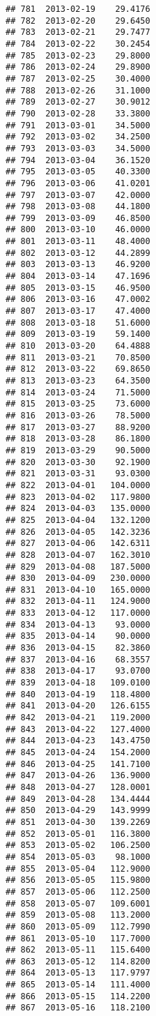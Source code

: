 \documentclass[
]{article}
\begin{document}
\begin{verbatim}
## 781  2013-02-19    29.4176
## 782  2013-02-20    29.6450
## 783  2013-02-21    29.7477
## 784  2013-02-22    30.2454
## 785  2013-02-23    29.8000
## 786  2013-02-24    29.8900
## 787  2013-02-25    30.4000
## 788  2013-02-26    31.1000
## 789  2013-02-27    30.9012
## 790  2013-02-28    33.3800
## 791  2013-03-01    34.5000
## 792  2013-03-02    34.2500
## 793  2013-03-03    34.5000
## 794  2013-03-04    36.1520
## 795  2013-03-05    40.3300
## 796  2013-03-06    41.0201
## 797  2013-03-07    42.0000
## 798  2013-03-08    44.1800
## 799  2013-03-09    46.8500
## 800  2013-03-10    46.0000
## 801  2013-03-11    48.4000
## 802  2013-03-12    44.2899
## 803  2013-03-13    46.9200
## 804  2013-03-14    47.1696
## 805  2013-03-15    46.9500
## 806  2013-03-16    47.0002
## 807  2013-03-17    47.4000
## 808  2013-03-18    51.6000
## 809  2013-03-19    59.1400
## 810  2013-03-20    64.4888
## 811  2013-03-21    70.8500
## 812  2013-03-22    69.8650
## 813  2013-03-23    64.3500
## 814  2013-03-24    71.5000
## 815  2013-03-25    73.6000
## 816  2013-03-26    78.5000
## 817  2013-03-27    88.9200
## 818  2013-03-28    86.1800
## 819  2013-03-29    90.5000
## 820  2013-03-30    92.1900
## 821  2013-03-31    93.0300
## 822  2013-04-01   104.0000
## 823  2013-04-02   117.9800
## 824  2013-04-03   135.0000
## 825  2013-04-04   132.1200
## 826  2013-04-05   142.3236
## 827  2013-04-06   142.6311
## 828  2013-04-07   162.3010
## 829  2013-04-08   187.5000
## 830  2013-04-09   230.0000
## 831  2013-04-10   165.0000
## 832  2013-04-11   124.9000
## 833  2013-04-12   117.0000
## 834  2013-04-13    93.0000
## 835  2013-04-14    90.0000
## 836  2013-04-15    82.3860
## 837  2013-04-16    68.3557
## 838  2013-04-17    93.0700
## 839  2013-04-18   109.0100
## 840  2013-04-19   118.4800
## 841  2013-04-20   126.6155
## 842  2013-04-21   119.2000
## 843  2013-04-22   127.4000
## 844  2013-04-23   143.4750
## 845  2013-04-24   154.2000
## 846  2013-04-25   141.7100
## 847  2013-04-26   136.9000
## 848  2013-04-27   128.0001
## 849  2013-04-28   134.4444
## 850  2013-04-29   143.9999
## 851  2013-04-30   139.2269
## 852  2013-05-01   116.3800
## 853  2013-05-02   106.2500
## 854  2013-05-03    98.1000
## 855  2013-05-04   112.9000
## 856  2013-05-05   115.9800
## 857  2013-05-06   112.2500
## 858  2013-05-07   109.6001
## 859  2013-05-08   113.2000
## 860  2013-05-09   112.7990
## 861  2013-05-10   117.7000
## 862  2013-05-11   115.6400
## 863  2013-05-12   114.8200
## 864  2013-05-13   117.9797
## 865  2013-05-14   111.4000
## 866  2013-05-15   114.2200
## 867  2013-05-16   118.2100

\end{verbatim}
\end{document}
